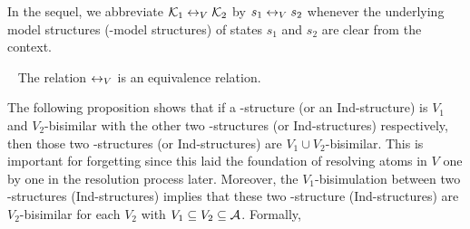 \documentclass{article}
\begin{document}
 In the sequel, we abbreviate ${\cal K}_1 \leftrightarrow_V {\cal K}_2$
 by $s_1 \leftrightarrow_V s_2 $
 whenever the underlying model structures (\Ind-model structures) of states $s_1$ and $s_2$ are clear from the context.



 \begin{lemma}\label{lem:equive}~\cite{renyansfirstpaper}
  The relation $\leftrightarrow_V$ is an equivalence relation.
\end{lemma}

The following proposition shows that if a \MPK-structure (or an Ind-structure) is $V_1$ and $V_2$-bisimilar with the other two \MPK-structures (or Ind-structures) respectively, then those two \MPK-structures (or Ind-structures) are $V_1 \cup V_2$-bisimilar. This is important for forgetting since this laid the foundation of resolving atoms in $V$ one by one in the resolution process later.
Moreover, the $V_1$-bisimulation between two \MPK-structures (Ind-structures) implies that these two \MPK-structure (Ind-structures) are $V_2$-bisimilar for each $V_2$ with $V_1 \subseteq V_2 \subseteq {\cal A}$.
Formally,
\end{document}
